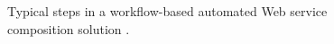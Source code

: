 \begin{figure}
\centerline{
}
\caption{Typical steps in a workflow-based automated Web service composition solution \cite{moghaddam2014service}.}
\label{fig:steps}
\end{figure}

